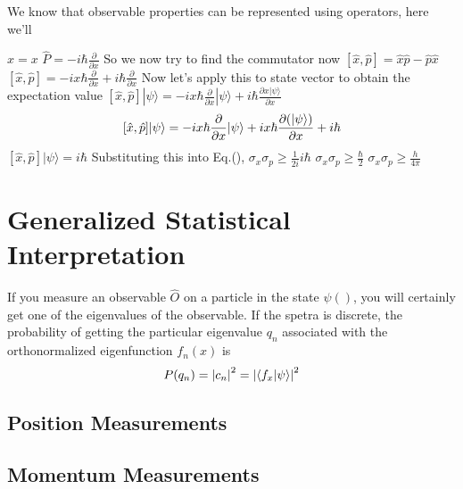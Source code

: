 We know that observable properties can be represented using operators, here we'll 

$\hat{x} = x$
$\hat{P} = -i\hbar \frac{\partial}{\partial x}$
So we now try to find the commutator now
$[\hat{x}, \hat{p}] = \hat{x}\hat{p} - \hat{p}\hat{x}$
$[\hat{x}, \hat{p}] = -ix\hbar \frac{\partial}{\partial x} + i\hbar \frac{\partial}{\partial x}$
Now let's apply this to state vector to obtain the expectation value
$[\hat{x}, \hat{p}] |\psi\rangle = -ix\hbar \frac{\partial}{\partial x} |\psi\rangle + i\hbar \frac{\partial x|\psi\rangle}{\partial x}$
$$[\hat{x}, \hat{p}] |\psi\rangle = -ix\hbar \frac{\partial}{\partial x} |\psi\rangle + ix\hbar \pdv{(|\psi\rangle)}{x} + i\hbar$$
$[\hat{x}, \hat{p}] |\psi\rangle = i\hbar$
Substituting this into Eq.(),
$\sigma_{x}\sigma_{p} \geq \frac{1}{2i} i\hbar$
$\sigma_{x}\sigma_{p} \geq \frac{\hbar}{2}$ 
$\sigma_{x}\sigma_{p} \geq \frac{h}{4 \pi}$
\section{Generalized Statistical Interpretation}
If you measure an observable $\hat{O}$ on a particle in the state $\psi()$, you will certainly get one of the eigenvalues of the observable. If the spetra is discrete, the probability of getting the particular eigenvalue $q_{n}$ associated with the orthonormalized eigenfunction $f_{n}(x)$ is
\begin{equation}
	P(q_{n}) = \abs{c_{n}}^{2} = \abs{\braket{f_{x}}{\psi}}^{2}
\end{equation}
\subsection{Position Measurements}

\subsection{Momentum Measurements}
